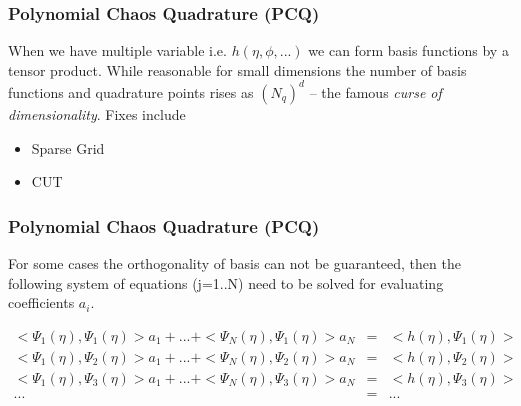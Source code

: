 \documentclass[10pt]{beamer}
\begin{document}
\begin{frame}
\frametitle{Polynomial Chaos Quadrature (PCQ)}
When we have multiple variable i.e. $h(\eta,\phi, ...)$ we can form basis functions by a tensor product. While reasonable for small dimensions the
number of basis functions and quadrature points rises as $(N_q)^d$ -- the famous {\it curse of dimensionality}. Fixes include
\begin{itemize}
\item Sparse Grid
\item CUT
\end{itemize}
\end{frame}
\begin{frame}
\frametitle{Polynomial Chaos Quadrature (PCQ)}
For some cases the orthogonality of basis can not be guaranteed, then the following system of equations (j=1..N)  need to be solved for evaluating coefficients $a_i$.

\begin{eqnarray*}
   < \Psi_1 (\eta), \Psi_1 (\eta)>a_1+ ... +<\Psi_N(\eta),\Psi_1(\eta)> a_N  &= &<h(\eta), \Psi_1(\eta) > \\
   < \Psi_1 (\eta), \Psi_2 (\eta)> a_1+ ... +<\Psi_N(\eta),\Psi_2(\eta)> a_N    &=& <h(\eta), \Psi_2 (\eta) > \\
   < \Psi_1 (\eta), \Psi_3 (\eta)> a_1+ ... +<\Psi_N(\eta),\Psi_3(\eta)> a_N    &=& <h(\eta), \Psi_3 (\eta) > \\
   ... &=  & ... \\
\end{eqnarray*}
\end{frame}
\end{document}
